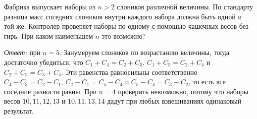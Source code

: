 \problem
Фабрика выпускает наборы из $n > 2$ слоников различной величины.
По стандарту разница масс соседних слоников внутри каждого набора должна быть
одной и той же.
Контролер проверяет наборы по одному с помощью чашечных весов без гирь.
При каком наименьшем $n$ это возможно?

\solution
\emph{Ответ:} при $n = 5$.
Занумеруем слоников по возрастанию величины, тогда достаточно убедиться, что
$C_1 + C_4 = C_2 + C_3$, $C_1 + C_5 = C_2 + C_4$ и $C_2 + C_5 = C_3 + C_4$.
Эти равенства равносильны соответственно $C_4 - C_3 = C_2 - C_1$,
$C_2 - C_1 = C_5 - C_4$ и $C_5 - C_4 = C_3 - C_2$, то есть все соседние
разности равны.
При $n = 4$ проверить невозможно, потому что наборы весов $10, 11, 12, 13$ и
$10, 11, 13, 14$ дадут при любых взвешиваниях одинаковый результат.
\endproblem

